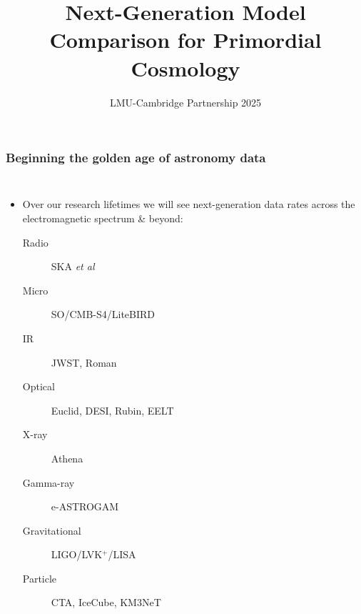 \documentclass[aspectratio=169]{beamer}
\title{Next-Generation Model Comparison for Primordial Cosmology}
\date{LMU-Cambridge Partnership 2025}
\begin{document}
\begin{frame}
    \titlepage
\end{frame}

\begin{frame}
    \frametitle{Beginning the golden age of astronomy data}
    \begin{columns}
        \begin{itemize}
            \item Over our research lifetimes we will see next-generation data rates across the electromagnetic spectrum \& beyond:
                \begin{description}
                    \item[Radio] SKA \textit{et al}
                    \item[Micro] SO/CMB-S4/LiteBIRD
                    \item[IR] JWST, Roman
                    \item[Optical] Euclid, DESI, Rubin, EELT
                    \item[X-ray] Athena
                    \item[Gamma-ray] e-ASTROGAM
                    \item[Gravitational] LIGO/LVK$^+$/LISA
                    \item[Particle] CTA, IceCube, KM3NeT
                \end{description}
        \end{itemize}


\end{columns}
\end{frame}
\end{document}
